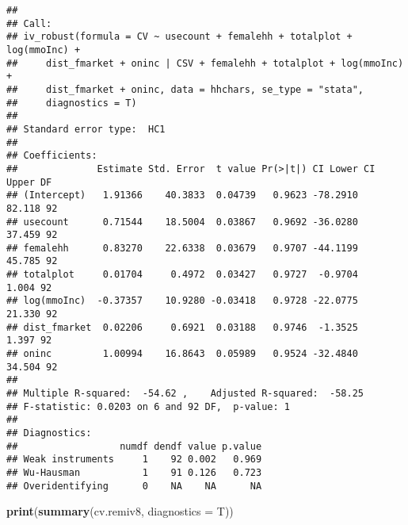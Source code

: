 \documentclass[
]{article}
\newenvironment{Shaded}{\begin{snugshade}}{\end{snugshade}}
\newcommand{\DataTypeTok}[1]{\textcolor[rgb]{0.13,0.29,0.53}{#1}}
\newcommand{\KeywordTok}[1]{\textcolor[rgb]{0.13,0.29,0.53}{\textbf{#1}}}
\newcommand{\NormalTok}[1]{#1}
\begin{document}
\begin{verbatim}
## 
## Call:
## iv_robust(formula = CV ~ usecount + femalehh + totalplot + log(mmoInc) + 
##     dist_fmarket + oninc | CSV + femalehh + totalplot + log(mmoInc) + 
##     dist_fmarket + oninc, data = hhchars, se_type = "stata", 
##     diagnostics = T)
## 
## Standard error type:  HC1 
## 
## Coefficients:
##              Estimate Std. Error  t value Pr(>|t|) CI Lower CI Upper DF
## (Intercept)   1.91366    40.3833  0.04739   0.9623 -78.2910   82.118 92
## usecount      0.71544    18.5004  0.03867   0.9692 -36.0280   37.459 92
## femalehh      0.83270    22.6338  0.03679   0.9707 -44.1199   45.785 92
## totalplot     0.01704     0.4972  0.03427   0.9727  -0.9704    1.004 92
## log(mmoInc)  -0.37357    10.9280 -0.03418   0.9728 -22.0775   21.330 92
## dist_fmarket  0.02206     0.6921  0.03188   0.9746  -1.3525    1.397 92
## oninc         1.00994    16.8643  0.05989   0.9524 -32.4840   34.504 92
## 
## Multiple R-squared:  -54.62 ,    Adjusted R-squared:  -58.25 
## F-statistic: 0.0203 on 6 and 92 DF,  p-value: 1
## 
## Diagnostics:
##                  numdf dendf value p.value
## Weak instruments     1    92 0.002   0.969
## Wu-Hausman           1    91 0.126   0.723
## Overidentifying      0    NA    NA      NA
\end{verbatim}

\pagebreak

\begin{Shaded}
\begin{Highlighting}[]
\KeywordTok{print}\NormalTok{(}\KeywordTok{summary}\NormalTok{(cv.remiv8, }\DataTypeTok{diagnostics =}\NormalTok{ T))}
\end{Highlighting}
\end{Shaded}
\end{document}
